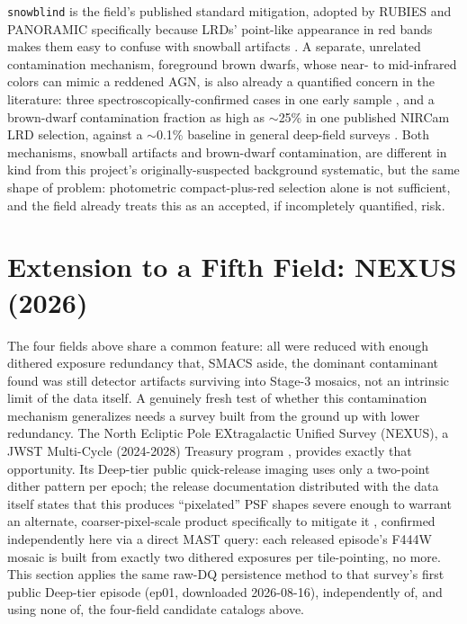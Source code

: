 \documentclass[11pt]{article}
\begin{document}
\texttt{snowblind} is the field's published standard mitigation, adopted by
RUBIES and PANORAMIC specifically because LRDs' point-like appearance in red
bands makes them easy to confuse with snowball artifacts \cite{Hviding2025}. A
separate, unrelated contamination mechanism, foreground brown dwarfs, whose
near- to mid-infrared colors can mimic a reddened AGN, is also already a
quantified concern in the literature: three spectroscopically-confirmed cases in
one early sample \cite{Langeroodi2023}, and a brown-dwarf contamination fraction
as high as $\sim$25\% in one published NIRCam LRD selection, against a
$\sim$0.1\% baseline in general deep-field surveys \cite{Tu2025}. Both mechanisms,
snowball artifacts and brown-dwarf contamination, are different in kind from
this project's originally-suspected background systematic, but the same shape of
problem: photometric compact-plus-red selection alone is not sufficient, and the
field already treats this as an accepted, if incompletely quantified, risk.

\section{Extension to a Fifth Field: NEXUS (2026)}
\label{sec:nexus}

The four fields above share a common feature: all were reduced with enough dithered
exposure redundancy that, SMACS aside, the dominant contaminant found was still
detector artifacts surviving into Stage-3 mosaics, not an intrinsic limit of the
data itself. A genuinely fresh test of whether this contamination mechanism
generalizes needs a survey built from the ground up with lower redundancy. The
North Ecliptic Pole EXtragalactic Unified Survey (NEXUS), a JWST Multi-Cycle
(2024-2028) Treasury program \cite{Shen2024nexus}, provides exactly that
opportunity. Its Deep-tier public quick-release imaging uses only a two-point
dither pattern per epoch; the release documentation distributed with the data
itself states that this produces ``pixelated'' PSF shapes severe enough to
warrant an alternate, coarser-pixel-scale product specifically to mitigate it
\cite{NEXUSqdr2026}, confirmed independently here via a direct MAST query: each
released episode's F444W mosaic is built from exactly two dithered exposures per
tile-pointing, no more. This section applies the same raw-DQ persistence method
to that survey's first public Deep-tier episode (ep01, downloaded 2026-08-16),
independently of, and using none of, the four-field candidate catalogs above.
\end{document}

